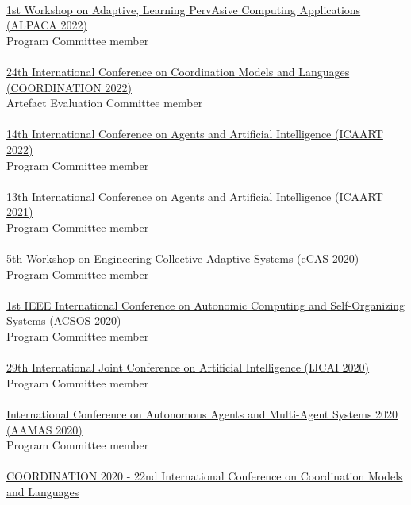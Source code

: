 \halfblankline \\
\href{https://www.discotec.org/2022/coordination}{1st Workshop on Adaptive, Learning PervAsive Computing Applications
(ALPACA 2022)}
\\ Program Committee member \\
\halfblankline \\
\href{https://www.discotec.org/2022/coordination}{24th International Conference on Coordination Models and Languages
(COORDINATION 2022)}
\\ Artefact Evaluation Committee member \\
\halfblankline \\
\href{http://www.icaart.org/?y=2022}{14th International Conference on Agents and Artificial Intelligence
(ICAART 2022)}
\\ Program Committee member \\
\halfblankline \\
\href{http://www.icaart.org/?y=2021}{13th International Conference on Agents and Artificial Intelligence
(ICAART 2021)}
\\ Program Committee member \\
\halfblankline \\
\href{http://archive.vn/wip/38Ah6}{5th Workshop on Engineering Collective Adaptive Systems (eCAS 2020)}
\\ Program Committee member \\
\halfblankline \\
\href{https://conf.researchr.org/home/acsos-2020}{1st IEEE International Conference on Autonomic Computing and Self-Organizing Systems (ACSOS 2020)}
\\ Program Committee member \\
\halfblankline \\
\href{https://https://ijcai20.org/}{29th International Joint Conference on Artificial Intelligence (IJCAI 2020)}
\\ Program Committee member \\
\halfblankline \\
\href{https://aamas2020.conference.auckland.ac.nz/program-committee-members/}{International Conference on Autonomous Agents and Multi-Agent Systems 2020 (AAMAS 2020)}
\\ Program Committee member \\
\halfblankline \\
\href{http://www.discotec.org/2020/coordination}{COORDINATION 2020 - 22nd International Conference on Coordination Models and Languages}
